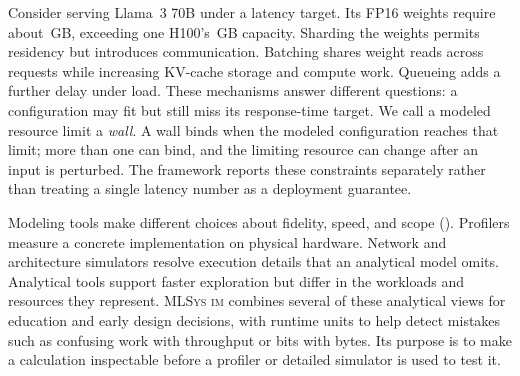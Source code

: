 \documentclass[10pt,twocolumn]{article}
\newcommand{\mlsysim}{\mbox{\textsc{MLSys}\,\textperiodcentered\,\textsc{im}}\xspace}
\newcommand{\cvalint}[1]{\pgfmathprintnumber[fixed, precision=0, 1000 sep={\,}]{#1}}
\begin{document}
Consider serving Llama~3 70B under a latency target. Its FP16 weights require about \cvalint{\LLaMAWeightsGB}\,GB, exceeding one H100's \cvalint{\HhHBMGB}\,GB capacity. Sharding the weights permits residency but introduces communication. Batching shares weight reads across requests while increasing KV-cache storage and compute work. Queueing adds a further delay under load. These mechanisms answer different questions: a configuration may fit but still miss its response-time target. We call a modeled resource limit a \emph{wall}. A wall binds when the modeled configuration reaches that limit; more than one can bind, and the limiting resource can change after an input is perturbed. The framework reports these constraints separately rather than treating a single latency number as a deployment guarantee.

Modeling tools make different choices about fidelity, speed, and scope (). Profilers measure a concrete implementation on physical hardware. Network and architecture simulators resolve execution details that an analytical model omits. Analytical tools support faster exploration but differ in the workloads and resources they represent. \mlsysim combines several of these analytical views for education and early design decisions, with runtime units to help detect mistakes such as confusing work with throughput or bits with bytes. Its purpose is to make a calculation inspectable before a profiler or detailed simulator is used to test it.
\end{document}
